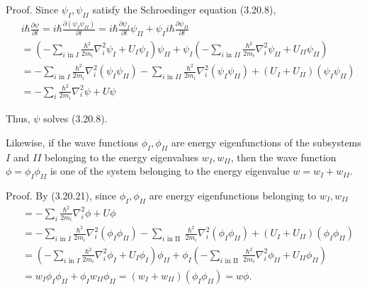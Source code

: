 \documentclass{article}
\begin{document}
Proof. Since $\psi_{I}, \psi_{I I}$ satisfy the Schroedinger equation (3.20.8),
$$
\begin{align*}
& i \hbar \frac{\partial \psi}{\partial t}=i \hbar \frac{\partial\left(\psi_{I} \psi_{I I}\right)}{\partial t}=i \hbar \frac{\partial \psi_{I}}{\partial t} \psi_{I I}+\psi_{I} i \hbar \frac{\partial \psi_{I I}}{\partial t}  \tag{3.20.28}\\
& =\left(-\sum_{i \text { in } I} \frac{\hbar^{2}}{2 m_{i}} \nabla_{i}^{2} \psi_{I}+U_{I} \psi_{I}\right) \psi_{I I}+\psi_{I}\left(-\sum_{i \text { in } I I} \frac{\hbar^{2}}{2 m_{i}} \nabla_{i}^{2} \psi_{I I}+U_{I I} \psi_{I I}\right) \\
& =-\sum_{i \text { in } I} \frac{\hbar^{2}}{2 m_{i}} \nabla_{i}^{2}\left(\psi_{I} \psi_{I I}\right)-\sum_{i \text { in } I I} \frac{\hbar^{2}}{2 m_{i}} \nabla_{i}^{2}\left(\psi_{I} \psi_{I I}\right)+\left(U_{I}+U_{I I}\right)\left(\psi_{I} \psi_{I I}\right) \\
& =-\sum_{i} \frac{\hbar^{2}}{2 m_{i}} \nabla_{i}^{2} \psi+U \psi
\end{align*}
$$

Thus, $\psi$ solves (3.20.8).

Likewise, if the wave functions $\phi_{I}, \phi_{I I}$ are energy eigenfunctions of the subsystems $I$ and $I I$ belonging to the energy eigenvalues $w_{I}, w_{I I}$, then the wave function $\phi=\phi_{I} \phi_{I I}$ is one of the system belonging to the energy eigenvalue $w=w_{I}+w_{I I}$.

Proof. By (3.20.21), since $\phi_{I}, \phi_{I I}$ are energy eigenfunctions belonging to $w_{I}, w_{I I}$
$$
\begin{align*}
& =-\sum_{i} \frac{\hbar^{2}}{2 m_{i}} \nabla_{i}^{2} \phi+U \phi  \tag{3.20.29}\\
& =-\sum_{i \text { in } I} \frac{\hbar^{2}}{2 m_{i}} \nabla_{i}^{2}\left(\phi_{I} \phi_{I I}\right)-\sum_{i \text { in II }} \frac{\hbar^{2}}{2 m_{i}} \nabla_{i}^{2}\left(\phi_{I} \phi_{I I}\right)+\left(U_{I}+U_{I I}\right)\left(\phi_{I} \phi_{I I}\right) \\
& =\left(-\sum_{i \text { in } I} \frac{\hbar^{2}}{2 m_{i}} \nabla_{i}^{2} \phi_{I}+U_{I} \phi_{I}\right) \phi_{I I}+\phi_{I}\left(-\sum_{i \text { in II }} \frac{\hbar^{2}}{2 m_{i}} \nabla_{i}^{2} \phi_{I I}+U_{I I} \phi_{I I}\right) \\
& =w_{I} \phi_{I} \phi_{I I}+\phi_{I} w_{I I} \phi_{I I}=\left(w_{I}+w_{I I}\right)\left(\phi_{I} \phi_{I I}\right)=w \phi .
\end{align*}
$$
\end{document}
